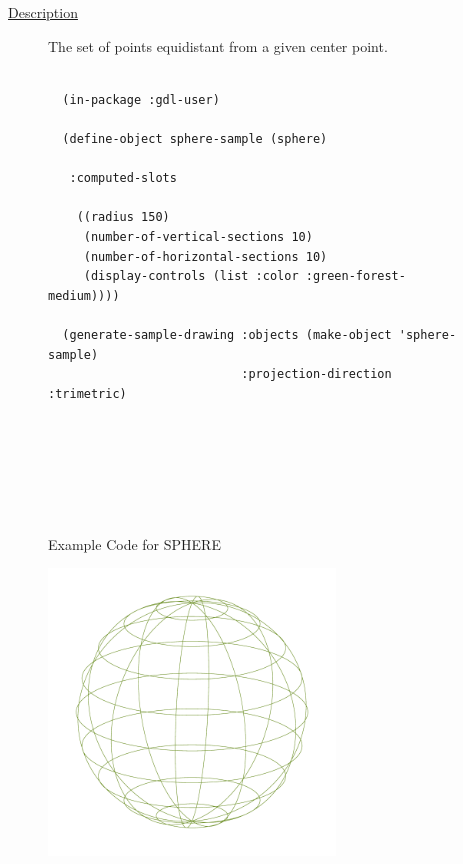 \documentclass [11pt]{book}
\begin{document}
\begin{itemize}
\begin{description}

\item [
\underline{Description}]


The set of points equidistant from a given center point.



\end{description}




\begin{figure}
\begin{lrbox}{\boxedverb}
\begin{minipage}{\linewidth}
{\small

\begin{verbatim}
  
  (in-package :gdl-user)
  
  (define-object sphere-sample (sphere)
    
   :computed-slots

    ((radius 150)
     (number-of-vertical-sections 10)
     (number-of-horizontal-sections 10)
     (display-controls (list :color :green-forest-medium))))

  (generate-sample-drawing :objects (make-object 'sphere-sample) 
                           :projection-direction :trimetric)





                  

\end{verbatim}}
\end{minipage}
\end{lrbox}
\fbox{\usebox{\boxedverb}}

\caption{Example Code for SPHERE}

\label{fig:example-code-SPHERE}

\end{figure}

\begin{figure}
\begin{center}
\includegraphics[width=3in,height=3in]{../images/example-SPHERE.pdf}
\end{center}


\end{figure}
\end{itemize}
\end{document}
